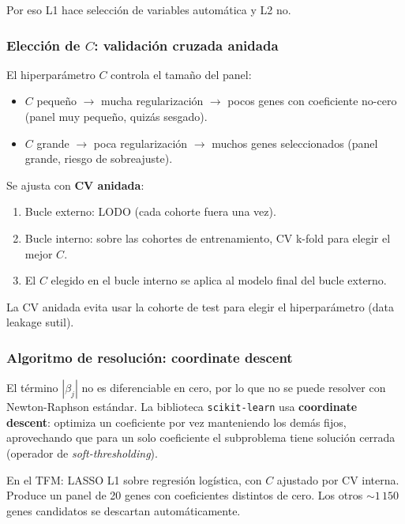 \documentclass[11pt, a4paper]{article}
\begin{document}
Por eso L1 hace selecci\'on de variables autom\'atica y L2 no.

\subsubsection*{Elecci\'on de $C$: validaci\'on cruzada anidada}

El hiperpar\'ametro $C$ controla el tama\~no del panel:

\begin{itemize}[leftmargin=1.2em]
  \item $C$ peque\~no $\to$ mucha regularizaci\'on $\to$ pocos genes
  con coeficiente no-cero (panel muy peque\~no, quiz\'as sesgado).
  \item $C$ grande $\to$ poca regularizaci\'on $\to$ muchos genes
  seleccionados (panel grande, riesgo de sobreajuste).
\end{itemize}

Se ajusta con \textbf{CV anidada}:

\begin{enumerate}[leftmargin=1.4em]
  \item Bucle externo: LODO (cada cohorte fuera una vez).
  \item Bucle interno: sobre las cohortes de entrenamiento, CV k-fold
  para elegir el mejor $C$.
  \item El $C$ elegido en el bucle interno se aplica al modelo final
  del bucle externo.
\end{enumerate}

La CV anidada evita usar la cohorte de test para elegir el
hiperpar\'ametro (data leakage sutil).

\subsubsection*{Algoritmo de resoluci\'on: coordinate descent}

El t\'ermino $|\beta_j|$ no es diferenciable en cero, por lo que no se
puede resolver con Newton-Raphson est\'andar. La biblioteca
\texttt{scikit-learn} usa \textbf{coordinate descent}: optimiza un
coeficiente por vez manteniendo los dem\'as fijos, aprovechando que
para un solo coeficiente el subproblema tiene soluci\'on cerrada
(operador de \emph{soft-thresholding}).

En el TFM: LASSO L1 sobre regresi\'on log\'istica, con $C$ ajustado por
CV interna. Produce un panel de 20 genes con coeficientes distintos de
cero. Los otros ${\sim}1\,150$ genes candidatos se descartan
autom\'aticamente.
\end{document}
